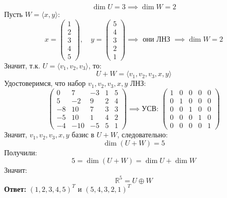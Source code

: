 \documentclass[a4paper]{article}
\newcommand{\mat}[1]{\begin{pmatrix} #1 \end{pmatrix}}
\newcommand{\RR}{\mathbb{R}}
\begin{document}
\begin{enumerate}
    $$\dim U = 3 \implies \dim W = 2$$
    Пусть $W = \langle x, y\rangle$: 
    $$
    x = \mat{1\\ 2\\ 3\\4\\ 5}, \quad y = \mat{5\\4\\3\\2\\1} \implies \text{ они ЛНЗ } \implies \dim W = 2
    $$
    Значит, т.к. $U = \langle v_1, v_2, v_3\rangle$, то:
    $$U+W = \langle v_1, v_2, v_3, x, y \rangle$$
    Удостоверимся, что набор $v_1, v_2, v_3, x, y$ ЛНЗ:
    $$\begin{pmatrix}
        0 & 7 & -3 & 1 & 5\\
        5 & -2 & 9 & 2 & 4\\
        -8 & 10 & 7 & 3 & 3\\
        -5 & 10 & 1 & 4 & 2\\
        -4 & -10 & -5 & 5 & 1
        \end{pmatrix} \implies \text{УСВ: } \begin{pmatrix}
            1 & 0 & 0 & 0 & 0 \\
            0 & 1 & 0 & 0 & 0 \\
            0 & 0 & 1 & 0 & 0 \\
            0 & 0 & 0 & 1 & 0 \\
            0 & 0 & 0 & 0 & 1
            \end{pmatrix}$$
    Значит, $v_1, v_2, v_3, x, y$ базис в $U+W$, следовательно:
    $$\dim (U + W) = 5$$
    Получили:
    $$5 = \dim(U + W) = \dim U + \dim W$$
    Значит:
    $$\RR^5= U \oplus W$$
    \textbf{Ответ:} $(1, 2, 3, 4, 5)^T$ и $(5, 4, 3, 2, 1)^T$ \\
    

\end{enumerate}
\end{document}
